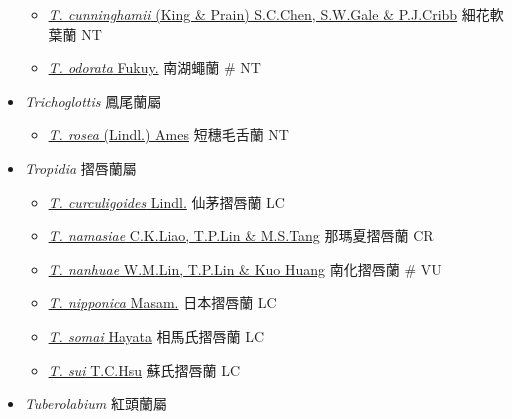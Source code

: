 \begin{itemize}
  \begin{itemize}
        \item[] \href{http://www.theplantlist.org/tpl1.1/search?q=Tipularia+cunninghamii}{\textit{T. cunninghamii} (King \& Prain) S.C.Chen, S.W.Gale \& P.J.Cribb}   細花軟葉蘭   NT
        \item[] \href{http://www.theplantlist.org/tpl1.1/search?q=Tipularia+odorata}{\textit{T. odorata} Fukuy.}   南湖蠅蘭  \# NT
  \end{itemize}
 \item[] \textit{Trichoglottis} 鳳尾蘭屬
                                
  \begin{itemize}
        \item[] \href{http://www.theplantlist.org/tpl1.1/search?q=Trichoglottis+rosea}{\textit{T. rosea} (Lindl.) Ames}   短穗毛舌蘭   NT
  \end{itemize}
 \item[] \textit{Tropidia} 摺唇蘭屬
                                
  \begin{itemize}
        \item[] \href{http://www.theplantlist.org/tpl1.1/search?q=Tropidia+curculigoides}{\textit{T. curculigoides} Lindl.}   仙茅摺唇蘭   LC
        \item[] \href{http://www.theplantlist.org/tpl1.1/search?q=Tropidia+namasiae}{\textit{T. namasiae} C.K.Liao, T.P.Lin \& M.S.Tang}   那瑪夏摺唇蘭   CR
        \item[] \href{http://www.theplantlist.org/tpl1.1/search?q=Tropidia+nanhuae}{\textit{T. nanhuae} W.M.Lin, T.P.Lin \& Kuo Huang}   南化摺唇蘭  \# VU
        \item[] \href{http://www.theplantlist.org/tpl1.1/search?q=Tropidia+nipponica}{\textit{T. nipponica} Masam.}   日本摺唇蘭   LC
        \item[] \href{http://www.theplantlist.org/tpl1.1/search?q=Tropidia+somai}{\textit{T. somai} Hayata}   相馬氏摺唇蘭   LC
        \item[] \href{http://www.theplantlist.org/tpl1.1/search?q=Tropidia+sui}{\textit{T. sui} T.C.Hsu}   蘇氏摺唇蘭   LC
  \end{itemize}
 \item[] \textit{Tuberolabium} 紅頭蘭屬
                                

\end{itemize}
